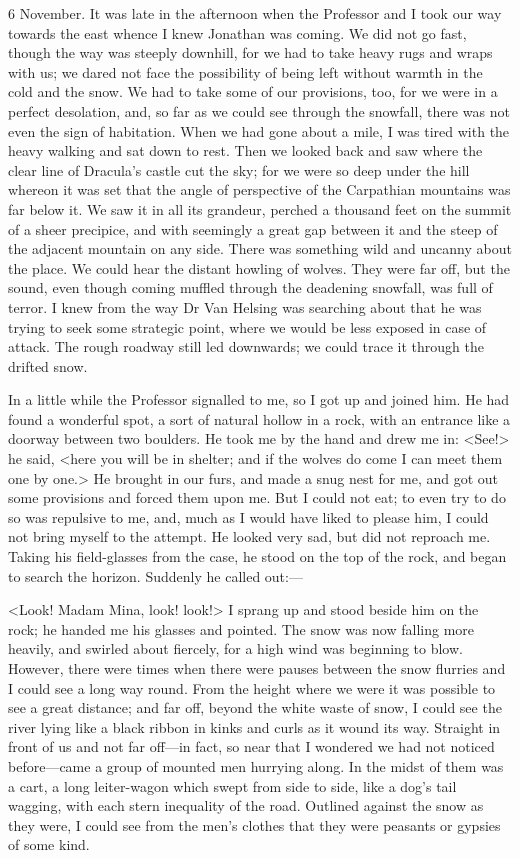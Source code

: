 \begin{diary}{6 November.}
It was late in the afternoon when the Professor and I took our way towards the east whence I knew Jonathan was coming. We did not go fast, though the way was steeply downhill, for we had to take heavy rugs and wraps with us; we dared not face the possibility of being left without warmth in the cold and the snow. We had to take some of our provisions, too, for we were in a perfect desolation, and, so far as we could see through the snowfall, there was not even the sign of habitation. When we had gone about a mile, I was tired with the heavy walking and sat down to rest. Then we looked back and saw where the clear line of Dracula's castle cut the sky; for we were so deep under the hill whereon it was set that the angle of perspective of the Carpathian mountains was far below it. We saw it in all its grandeur, perched a thousand feet on the summit of a sheer precipice, and with seemingly a great gap between it and the steep of the adjacent mountain on any side. There was something wild and uncanny about the place. We could hear the distant howling of wolves. They were far off, but the sound, even though coming muffled through the deadening snowfall, was full of terror. I knew from the way Dr Van Helsing was searching about that he was trying to seek some strategic point, where we would be less exposed in case of attack. The rough roadway still led downwards; we could trace it through the drifted snow.

In a little while the Professor signalled to me, so I got up and joined him. He had found a wonderful spot, a sort of natural hollow in a rock, with an entrance like a doorway between two boulders. He took me by the hand and drew me in: <See!> he said, <here you will be in shelter; and if the wolves do come I can meet them one by one.> He brought in our furs, and made a snug nest for me, and got out some provisions and forced them upon me. But I could not eat; to even try to do so was repulsive to me, and, much as I would have liked to please him, I could not bring myself to the attempt. He looked very sad, but did not reproach me. Taking his field-glasses from the case, he stood on the top of the rock, and began to search the horizon. Suddenly he called out:—

<Look! Madam Mina, look! look!> I sprang up and stood beside him on the rock; he handed me his glasses and pointed. The snow was now falling more heavily, and swirled about fiercely, for a high wind was beginning to blow. However, there were times when there were pauses between the snow flurries and I could see a long way round. From the height where we were it was possible to see a great distance; and far off, beyond the white waste of snow, I could see the river lying like a black ribbon in kinks and curls as it wound its way. Straight in front of us and not far off—in fact, so near that I wondered we had not noticed before—came a group of mounted men hurrying along. In the midst of them was a cart, a long leiter-wagon which swept from side to side, like a dog's tail wagging, with each stern inequality of the road. Outlined against the snow as they were, I could see from the men's clothes that they were peasants or gypsies of some kind.


\end{diary}
